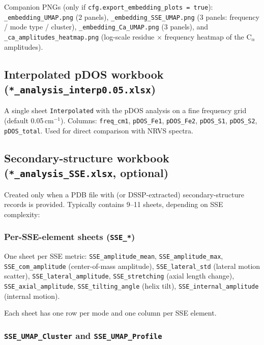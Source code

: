 \documentclass[11pt,a4paper,twoside]{article}
\theoremstyle{remark}
\begin{document}
Companion PNGs (only if \texttt{cfg.export\_embedding\_plots = true}):
\texttt{\_embedding\_UMAP.png} (2 panels),
\texttt{\_embedding\_SSE\_UMAP.png} (3 panels: frequency / mode type /
cluster), \texttt{\_embedding\_Ca\_UMAP.png} (3 panels), and
\texttt{\_ca\_amplitudes\_heatmap.png} (log-scale residue $\times$
frequency heatmap of the C$_\alpha$ amplitudes).

\subsection{Interpolated pDOS workbook (\texttt{*\_analysis\_interp0.05.xlsx})}
\label{app:wb-interp}

A single sheet \texttt{Interpolated} with the pDOS analysis on a
fine frequency grid (default 0.05\,cm$^{-1}$). Columns:
\texttt{freq\_cm1}, \texttt{pDOS\_Fe1}, \texttt{pDOS\_Fe2},
\texttt{pDOS\_S1}, \texttt{pDOS\_S2}, \texttt{pDOS\_total}. Used
for direct comparison with NRVS spectra.

\subsection{Secondary-structure workbook
            (\texttt{*\_analysis\_SSE.xlsx}, optional)}
\label{app:wb-sse}

Created only when a PDB file with (or DSSP-extracted)
secondary-structure records is provided. Typically contains
9--11 sheets, depending on SSE complexity:

\subsubsection*{Per-SSE-element sheets (\texttt{SSE\_*})}

One sheet per SSE metric:
\texttt{SSE\_amplitude\_mean},
\texttt{SSE\_amplitude\_max},
\texttt{SSE\_com\_amplitude} (center-of-mass amplitude),
\texttt{SSE\_lateral\_std} (lateral motion scatter),
\texttt{SSE\_lateral\_amplitude},
\texttt{SSE\_stretching} (axial length change),
\texttt{SSE\_axial\_amplitude},
\texttt{SSE\_tilting\_angle} (helix tilt),
\texttt{SSE\_internal\_amplitude} (internal motion).

Each sheet has one row per mode and one column per SSE element.

\subsubsection*{\texttt{SSE\_UMAP\_Cluster} and \texttt{SSE\_UMAP\_Profile}}
\end{document}
